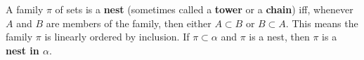 A family $\pi$ of sets is a \textbf{nest} (sometimes called a \textbf{tower} or a \textbf{chain}) iff, whenever $A$ and $B$ are members of the family, then either $A \subset B$ or $B \subset A$. This means the family $\pi$ is linearly ordered by inclusion. If $\pi \subset \alpha$ and $\pi$ is a nest, then $\pi$ is a \textbf{nest in $\alpha$}.
